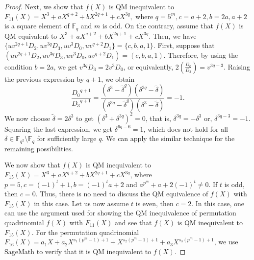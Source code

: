 \documentclass[12pt]{amsart}
\numberwithin{equation}{section}
\theoremstyle{definition}
\newcommand{\F}{\mathbb F}
\begin{document}
\begin{proof}
 Next, we show that $f(X)$ is QM inequivalent to $F_{11}(X)=X^3+aX^{q+2}+bX^{2q+1}+cX^{3q},$ where $q=5^m, c=a+2,b=2a, a+2$ is a square element of $\F_{q}$ and $m$ is odd. On the contrary, assume that $f(X)$ is QM equivalent to $X^3+aX^{q+2}+bX^{2q+1}+cX^{3q}.$ Then, we have $\{uv^{2q+1}D_2,uv^{3q}D_3,uv^3 D_0,uv^{q+2}D_1\}=\{c,b,a,1\}$. First, suppose that $(uv^{2q+1}D_2,uv^{3q}D_3,uv^3 D_0,uv^{q+2}D_1)=(c,b,a,1)$. Therefore, by using the condition $b=2a$, we get $v^{3q}D_3=2v^{3}D_0$, or equivalently, $2\left(\frac{D_0}{D_3}\right)=v^{3q-3}$. Raising the previous expression by $q+1$, we obtain 
 \[
 \frac{{D_0}^{q+1}}{{D_3}^{q+1}}=\dfrac{(\delta^{3}-{\tilde \delta}^q)(\delta^{3q}-{\tilde \delta})}{(\delta^{3q}-{\tilde \delta}^q)(\delta^3-{\tilde \delta})}=-1.
 \]
 We now choose $\tilde \delta=2\delta^3$ to get $(\delta^3+\delta^{3q})^2=0$, that is, $\delta^{3q}=-\delta^3$ or,  $\delta^{3q-3}=-1$. Squaring the last expression, we get $\delta^{6q-6}=1$, which does not hold for all $\delta \in \F_{q^2} \setminus \F_{q}$ for sufficiently large $q$.  We can apply the similar technique for the remaining possibilities.
 
We now show that $f(X)$ is QM inequivalent to $F_{15}(X)=X^3+aX^{q+2}+bX^{2q+1}+cX^{3q}$, where $p=5, c=(-1)^t+1,b=(-1)^ta+2$ and $a^{p^m}+a+2(-1)^t \neq 0$. If $t$ is odd, then $c=0$. Thus, there is no need to discuss the QM equivalence of $f(X)$ with $F_{15}(X)$ in this case. Let us now assume $t$ is even, then $c=2$. In this case, one can use the argument used for showing the QM inequivalence of permutation quadrinomial $f(X)$  with $F_{11}(X)$ and see that $f(X)$ is QM inequivalent to $F_{15}(X)$. For the permutation quadrinomial $F_{16}(X)=a_1X+a_2X^{s_1(p^m-1)+1}+X^{s_2(p^m-1)+1}+a_3X^{s_3(p^m-1)+1}$, we use SageMath to verify that it is QM inequivalent to $f(X)$.


\end{proof}
\end{document}
